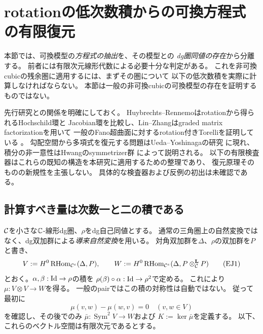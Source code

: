 \section{rotationの低次数積からの可換方程式の有限復元}
\label{sec:explicit-jacobian-recovery}

本節では、可換模型の\emph{方程式の抽出}を、その模型との
\emph{dg圏同値の存在}から分離する。
前者には有限次元線形代数による必要十分な判定がある。
これを非可換cubicの残余圏に適用するには、まずその圏について
以下の低次数積を実際に計算しなければならない。
本節は一般の非可換cubicの可換模型の存在を証明するものではない。

先行研究との関係を明確にしておく。
Huybrechts--Rennemoはrotationから得られるHochschild環と
Jacobian環を比較し\cite{HR}、Lin--Zhangはgraded matrix factorizationを用いて
一般のFano超曲面に対するrotation付きTorelliを証明している
\cite[Theorem~3.5, Remark~3.6, Section~5]{LZ}。
勾配空間から多項式を復元する問題はUeda--Yoshinagaの研究
\cite[Lemma~3]{ExplicitUedaYoshinaga}に現れ、
積分の非一意性はHwangのsymmetrizer群
\cite[Theorems~1.5--1.6]{ExplicitHwang}によって説明される。
以下の有限検査器はこれらの既知の構造を本研究に適用するための整理であり、
復元原理そのものの新規性を主張しない。
具体的な検査器および反例の初出は未確認である。

\subsection{計算すべき量は次数一と二の積である}

$\mathcal C$を小さな$\mathbb C$-線形dg圏、$\rho$をdg自己同値とする。
通常の三角圏上の自然変換ではなく、dg双加群による\emph{導来自然変換}を用いる。
対角双加群を$\Delta$、$\rho$の双加群を$P$と書き、
\[
 V:=H^0\operatorname{RHom}_{\mathcal C^e}(\Delta,P),\qquad
 W:=H^0\operatorname{RHom}_{\mathcal C^e}(\Delta,P\otimes^{\mathbf L}_{\mathcal C}P)
 \tag{EJ1}\label{eq:ej-low-degree}
\]
とおく。$\alpha,\beta:\operatorname{Id}\to\rho$の積を
$\rho(\beta)\circ\alpha:\operatorname{Id}\to\rho^2$で定める。
これにより$\mu:V\otimes V\to W$を得る。
一般のpairではこの積の対称性は自動ではない。
従って最初に
\[
 \mu(v,w)-\mu(w,v)=0\quad(v,w\in V)
 \tag{EJ2}\label{eq:ej-commutativity}
\]
を確認し、その後でのみ
$\bar\mu:\operatorname{Sym}^2V\to W$および
$K:=\ker\bar\mu$を定義する。
以下、これらのベクトル空間は有限次元であるとする。

